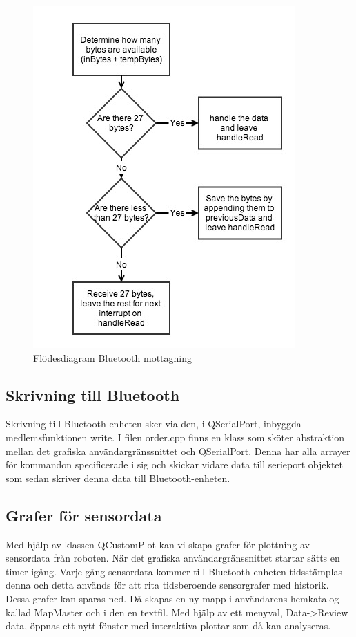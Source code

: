 \documentclass[a4paper,12pt,fleqn]{article}
\begin{document}
\begin{figure}[htp] %
  \begin{center}
  \includegraphics[keepaspectratio=true,width=0.6\linewidth]{bilder/bluetoothpc.jpg}  %
  \end{center}
  \caption{Flödesdiagram Bluetooth mottagning} %
  \label{fig:BTpc}
\end{figure}

\subsection{Skrivning till Bluetooth}
Skrivning till Bluetooth-enheten sker via den, i QSerialPort, inbyggda medlemsfunktionen write. I filen order.cpp finns en klass som sköter abstraktion mellan det grafiska användargränssnittet och QSerialPort. Denna har alla arrayer för kommandon specificerade i sig och skickar vidare data till serieport objektet som sedan skriver denna data till Bluetooth-enheten. 

\subsection{Grafer för sensordata}
Med hjälp av klassen QCustomPlot kan vi skapa grafer för plottning av sensordata från roboten. När det grafiska användargränssnittet startar sätts en timer igång. Varje gång sensordata kommer till Bluetooth-enheten tidsstämplas denna och detta används för att rita tidsberoende sensorgrafer med historik. 
Dessa grafer kan sparas ned. Då skapas en ny mapp i användarens hemkatalog kallad MapMaster och i den en textfil. Med hjälp av ett menyval, Data->Review data, öppnas ett nytt fönster med interaktiva plottar som då kan analyseras.
\end{document}
